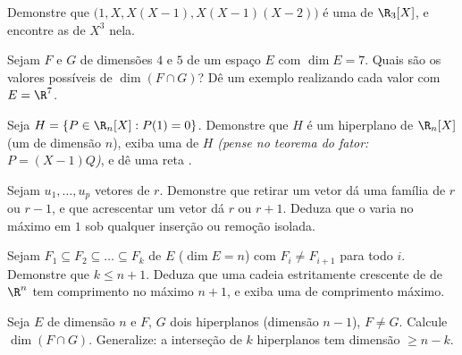 \begin{exercise}[$\star$]\label{exo:b1:findim:4}
Demonstre que $\bigl(1, X, X(X-1), X(X-1)(X-2)\bigr)$ é uma  de $\R_3[X]$, e encontre as
 de $X^3$ nela.
\end{exercise}

\begin{exercise}[$\star\star$]\label{exo:b1:findim:5}
Sejam $F$ e $G$  de dimensões $4$ e $5$ de um espaço $E$
com $\dim E = 7$. Quais são os valores possíveis de $\dim(F \cap
G)$? Dê um exemplo
realizando cada valor com $E = \R^7$.
\end{exercise}

\begin{exercise}[$\star\star$]\label{exo:b1:findim:6}
Seja $H = \{P \in \R_n[X] : P(1) = 0\}$. Demonstre que $H$ é um hiperplano de $\R_n[X]$ (um
 de dimensão $n$), exiba uma  de $H$ \emph{(pense no
teorema do fator: $P = (X-1)Q$)}, e dê uma reta .
\end{exercise}

\begin{exercise}[$\star\star$]\label{exo:b1:findim:7}
Sejam $u_1, \dots, u_p$ vetores de  $r$. Demonstre que retirar um vetor dá
uma família de  $r$ ou $r - 1$, e que acrescentar um vetor dá
 $r$ ou $r + 1$. Deduza que o  varia no máximo em $1$ sob
qualquer inserção ou remoção isolada.
\end{exercise}

\begin{exercise}[$\star\star\star$]\label{exo:b1:findim:8}
Sejam $F_1 \subseteq F_2 \subseteq \dots \subseteq F_k$  de $E$ ($\dim E = n$) com $F_i \neq F_{i+1}$ para todo $i$.
Demonstre que $k
\leq n + 1$. Deduza que uma cadeia estritamente crescente
de  de $\R^n$ tem comprimento no máximo $n + 1$, e exiba
uma de comprimento máximo.
\end{exercise}

\begin{exercise}[$\star\star\star$]\label{exo:b1:findim:9}
Seja $E$ de dimensão $n$ e $F$, $G$ dois hiperplanos (dimensão
$n - 1$), $F \neq G$. Calcule $\dim(F \cap G)$. Generalize: a interseção de $k$
hiperplanos tem dimensão $\geq n - k$.
\end{exercise}

